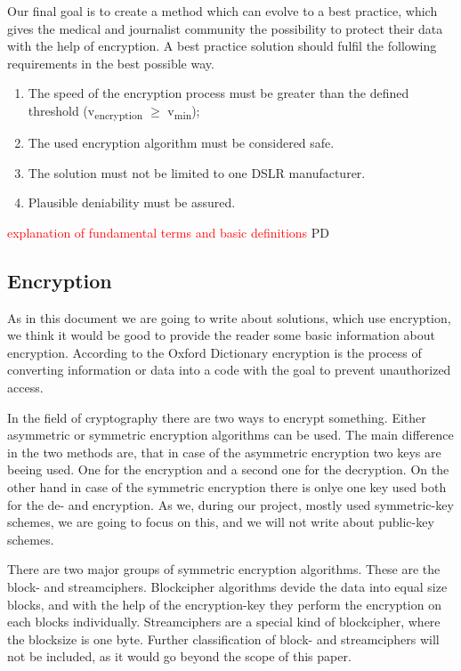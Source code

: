\documentclass[12pt,a4paper,titlepage,oneside]{scrartcl}
\newcommand\todo[1]{\textcolor{red}{#1}}
\begin{document}
Our final goal is to create a method which can evolve to a best practice, which gives the medical and journalist community the possibility to protect their data with the help of encryption.
A best practice solution should fulfil the following requirements in the best possible way.
\begin{enumerate}
  \item The speed of the encryption process must be greater than the defined threshold (v\textsubscript{encryption} $\geq$ v\textsubscript{min});
  \item The used encryption algorithm must be considered safe.
  \item The solution must not be limited to one DSLR manufacturer.
  \item Plausible deniability must be assured.
\end{enumerate}

\todo{explanation of fundamental terms and basic definitions}
PD

\subsection{Encryption}
As in this document we are going to write about solutions, which use encryption, we think it would be good to provide the reader some basic information about encryption.
According to the Oxford Dictionary encryption is the process of converting information or data into a code with the goal to prevent unauthorized access. \cite{OxforddictEncrypt}

In the field of cryptography there are two ways to encrypt something.
Either asymmetric or symmetric encryption algorithms can be used.
The main difference in the two methods are, that in case of the asymmetric encryption two keys are beeing used.
One for the encryption and a second one for the decryption.
On the other hand in case of the symmetric encryption there is onlye one key used both for the de- and encryption.
As we, during our project, mostly used symmetric-key schemes, we are going to focus on this, and we will not write about public-key schemes.

There are two major groups of symmetric encryption algorithms.
These are the block- and streamciphers.
Blockcipher algorithms devide the data into equal size blocks, and with the help of the encryption-key they perform the encryption on each blocks individually.
Streamciphers are a special kind of blockcipher, where the blocksize is one byte. \cite{menezes1996handbook}
Further classification of block- and streamciphers will not be included, as it would go beyond the scope of this paper.
\end{document}
